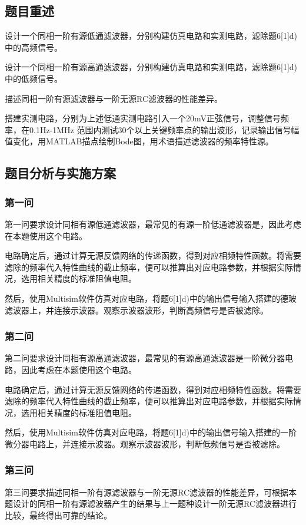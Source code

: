 \documentclass[./测控三级项目.tex]{subfiles} %
\begin{document}
	\subsection{题目重述}
		\begin{compactenum}
			\item 设计一个同相一阶有源低通滤波器，分别构建仿真电路和实测电路，滤除题6[1]d)中的高频信号。
			\item 设计一个同相一阶有源高通滤波器，分别构建仿真电路和实测电路，滤除题6[1]d)中的低频信号。
			\item 描述同相一阶有源滤波器与一阶无源RC滤波器的性能差异。
			\item 搭建实测电路，分别为上述低通实测电路引入一个20mV正弦信号，调整信号频率，在0.1Hz-1MHz 范围内测试30个以上关键频率点的输出波形，记录输出信号幅值变化，用MATLAB描点绘制Bode图，用术语描述滤波器的频率特性源。
		\end{compactenum}
	\subsection{题目分析与实施方案}
		\subsubsection{第一问}
			第一问要求设计同相有源低通滤波器，最常见的有源一阶低通滤波器是，因此考虑在本题使用这个电路。\par
			电路确定后，通过计算无源反馈网络的传递函数，得到对应相频特性函数。将需要滤除的频率代入特性曲线的截止频率，便可以推算出对应电路参数，并根据实际情况，选用相关精度的标准阻值电阻。\par
			然后，使用Multisim软件仿真对应电路，将题6[1]d)中的输出信号输入搭建的德玻滤波器上，并连接示波器。观察示波器波形，判断高频信号是否被滤除。
		\subsubsection{第二问}
			第二问要求设计同相有源高通滤波器，最常见的有源高通滤波器是一阶微分器电路，因此考虑在本题使用这个电路。\par
			电路确定后，通过计算无源反馈网络的传递函数，得到对应相频特性函数。将需要滤除的频率代入特性曲线的截止频率，便可以推算出对应电路参数，并根据实际情况，选用相关精度的标准阻值电阻。\par
			然后，使用Multisim软件仿真对应电路，将题6[1]d)中的输出信号输入搭建的一阶微分器电路上，并连接示波器。观察示波器波形，判断低频信号是否被滤除。
		\subsubsection{第三问}
			第三问要求描述同相一阶有源滤波器与一阶无源RC滤波器的性能差异，可根据本题设计的同相一阶有源滤波器产生的结果与上一题种设计一阶无源RC滤波器进行比较，最终得出可靠的结论。
\end{document}
